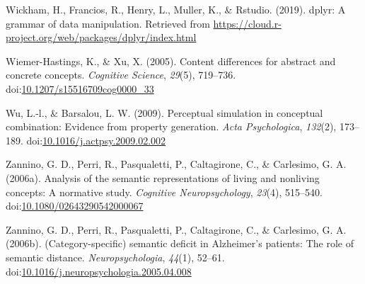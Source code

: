 \documentclass[man]{apa6}
\begin{document}
\leavevmode\hypertarget{ref-Wickham2019}{}%
Wickham, H., Francios, R., Henry, L., Muller, K., \& Rstudio. (2019). dplyr: A grammar of data manipulation. Retrieved from \url{https://cloud.r-project.org/web/packages/dplyr/index.html}

\leavevmode\hypertarget{ref-KatjaWiemer-Hastings2005}{}%
Wiemer-Hastings, K., \& Xu, X. (2005). Content differences for abstract and concrete concepts. \emph{Cognitive Science}, \emph{29}(5), 719--736. doi:\href{https://doi.org/10.1207/s15516709cog0000_33}{10.1207/s15516709cog0000\_33}

\leavevmode\hypertarget{ref-Wu2009}{}%
Wu, L.-l., \& Barsalou, L. W. (2009). Perceptual simulation in conceptual combination: Evidence from property generation. \emph{Acta Psychologica}, \emph{132}(2), 173--189. doi:\href{https://doi.org/10.1016/j.actpsy.2009.02.002}{10.1016/j.actpsy.2009.02.002}

\leavevmode\hypertarget{ref-DanieleZannino2006}{}%
Zannino, G. D., Perri, R., Pasqualetti, P., Caltagirone, C., \& Carlesimo, G. A. (2006a). Analysis of the semantic representations of living and nonliving concepts: A normative study. \emph{Cognitive Neuropsychology}, \emph{23}(4), 515--540. doi:\href{https://doi.org/10.1080/02643290542000067}{10.1080/02643290542000067}

\leavevmode\hypertarget{ref-Zannino2006}{}%
Zannino, G. D., Perri, R., Pasqualetti, P., Caltagirone, C., \& Carlesimo, G. A. (2006b). (Category-specific) semantic deficit in Alzheimer's patients: The role of semantic distance. \emph{Neuropsychologia}, \emph{44}(1), 52--61. doi:\href{https://doi.org/10.1016/j.neuropsychologia.2005.04.008}{10.1016/j.neuropsychologia.2005.04.008}

\endgroup
\end{document}
